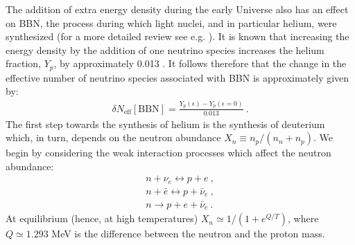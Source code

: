 \documentclass[12pt]{article}
\begin{document}
The addition of extra energy density during the early Universe also has an effect on BBN, the process during which light nuclei, and in particular helium, were synthesized (for a more detailed review see e.g. \cite{weinberg}). It is known that increasing the energy density by the addition of one neutrino species increases the helium fraction, $Y _p$, by approximately 0.013 \cite{bernstein}. It follows therefore that the change in the effective number of neutrino species associated with BBN is approximately given by:
%
\begin{eqnarray}
\delta N _{\text{eff}}[\text{BBN}] = \frac{Y _p (\epsilon) - Y _p (\epsilon = 0)}{0.013} \ .
\label{Neffbbn}
\end{eqnarray}
%
The first step towards the synthesis of helium is the synthesis of deuterium which, in turn, depends on the neutron abundance $X _n \equiv n _p/(n _n + n _p)$. We begin by considering the weak interaction processes which affect the neutron abundance:
%
\begin{eqnarray}
n + \nu _e \leftrightarrow p + e \ , \nonumber \\
n + \bar e \leftrightarrow p + \bar \nu _e \ , \nonumber \\
n \rightarrow p + e + \bar \nu _e \ .
\end{eqnarray}
%
At equilibrium (hence, at high temperatures) $X _n \simeq 1/(1 + e^{Q/T})$, where $Q \simeq 1.293$ MeV is the difference between the neutron and the proton mass.
\end{document}
